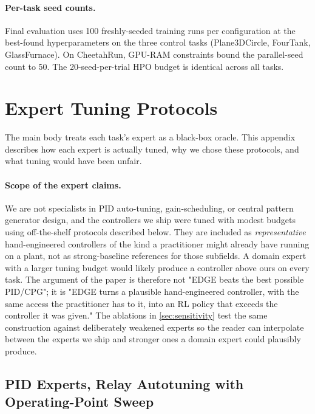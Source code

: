 \documentclass{article}
\begin{document}
\paragraph{Per-task seed counts.} Final evaluation uses 100
freshly-seeded training runs per configuration at the best-found
hyperparameters on the three control tasks (Plane3DCircle,
FourTank, GlassFurnace). On CheetahRun, GPU-RAM constraints bound
the parallel-seed count to 50. The 20-seed-per-trial HPO budget is
identical across all tasks.

\section{Expert Tuning Protocols}
\label{app:tuning}

The main body treats each task's expert as a black-box oracle. This appendix
describes how each expert is actually tuned, why we chose these protocols,
and what tuning would have been unfair.

\paragraph{Scope of the expert claims.}
We are not specialists in PID auto-tuning, gain-scheduling, or central
pattern generator design, and the controllers we ship were tuned with
modest budgets using off-the-shelf protocols described below. They are
included as \emph{representative} hand-engineered controllers of the
kind a practitioner might already have running on a plant, not as
strong-baseline references for those subfields. A domain expert with a
larger tuning budget would likely produce a controller above ours on
every task. The argument of the paper is therefore not "EDGE beats the
best possible PID/CPG"; it is "EDGE turns a plausible
hand-engineered controller, with the same access the practitioner has
to it, into an RL policy that exceeds the controller it was given." The
ablations in \cref{sec:sensitivity} test the same construction
against deliberately weakened experts so the reader can interpolate
between the experts we ship and stronger ones a domain expert could
plausibly produce.

\subsection{PID Experts, Relay Autotuning with Operating-Point Sweep}
\end{document}
